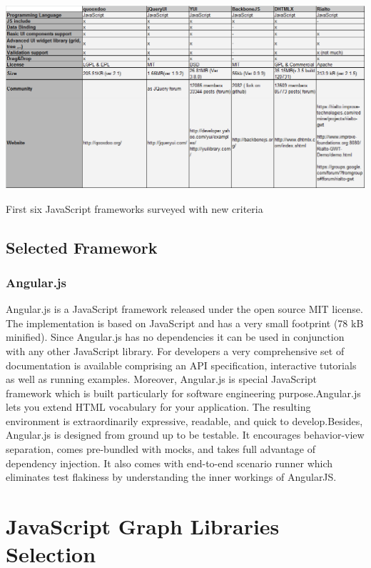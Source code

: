 \documentclass[14pt,a4paper]{extreport}
\begin{document}
			\begin{table}[ht]
				\begin{center}
					\includegraphics[scale=0.6]{JavaFrameTable3NewCriteria.png}
				
					\caption{First six JavaScript frameworks surveyed with new criteria}
				\end{center}
			
			\end{table}


		\subsection{Selected Framework}
			\subsubsection{Angular.js}
		Angular.js is a JavaScript framework released under the open source MIT license. The implementation is based on JavaScript and has a very small footprint (78 kB minified). Since Angular.js has no dependencies it can be used in conjunction with any other JavaScript library. For developers a very comprehensive set of documentation is available comprising an API specification, interactive tutorials as well as running examples. Moreover, Angular.js is special JavaScript framework which is built particularly for software engineering purpose.Angular.js lets you extend HTML vocabulary for your application. The resulting environment is extraordinarily expressive, readable, and quick to develop.Besides, Angular.js is designed from ground up to be testable. It encourages behavior-view separation, comes pre-bundled with mocks, and takes full advantage of dependency injection. It also comes with end-to-end scenario runner which eliminates test flakiness by understanding the inner workings of AngularJS.
					
 	\section{JavaScript Graph Libraries Selection}
\end{document}
